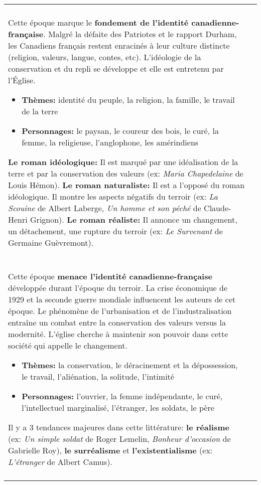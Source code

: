 \documentclass[11pt]{article}
\newcommand{\titre}[1]{{\Large\textbf{#1}}}
\begin{document}
\begin{tabularx}{\textwidth}{@{}XX@{}}
  \begin{minipage}[t]{\linewidth\fboxsep\fboxrule}
    \titre{Terroir (1840-1945)}\\
    Cette époque marque le \textbf{fondement de l'identité canadienne-française}. Malgré la défaite des Patriotes et le rapport Durham, les Canadiens français restent enracinés à leur culture distincte (religion, valeurs, langue, contes, etc). L'idéologie de la conservation et du repli se développe et elle est entretenu par l'Église.
    \begin{itemize}
      \item\textbf{Thèmes:} identité du peuple, la religion, la famille, le travail de la terre
      \item\textbf{Personnages:} le paysan, le coureur des bois, le curé, la femme, la religieuse, l'anglophone, les amérindiens
    \end{itemize}
    \textbf{Le roman idéologique:} Il est marqué par une idéalisation de la terre et par la conservation des valeurs (ex: \textit{Maria Chapedelaine} de Louis Hémon). \textbf{Le roman naturaliste:} Il est a l'opposé du roman idéologique. Il montre les aspects négatifs du terroir (ex: \textit{La Scouine} de Albert Laberge, \textit{Un homme et son péché} de Claude-Henri Grignon). \textbf{Le roman réaliste:} Il annonce un changement, un détachement, une rupture du terroir (ex: \textit{Le Survenant} de Germaine Guèvremont).\\
  \end{minipage}&
  
  \begin{minipage}[t]{\linewidth\fboxsep\fboxrule}
    \titre{Littérature Urbaine (1945-1960)}\\
    Cette époque \textbf{menace l'identité canadienne-française} développée durant l'époque du terroir. La crise économique de 1929 et la seconde guerre mondiale influencent les auteurs de cet époque. Le phénomène de l'urbanisation et de l'industralisation entraîne un combat entre la conservation des valeurs versus la modernité. L'église cherche à maintenir son pouvoir dans cette société qui appelle le changement.
    \begin{itemize}
      \item\textbf{Thèmes:} la conservation, le déracinement et la dépossession, le travail, l'aliénation, la solitude, l'intimité
      \item\textbf{Personnages:} l'ouvrier, la femme indépendante, le curé, l'intellectuel marginalisé, l'étranger, les soldats, le père 
    \end{itemize}
    Il y a 3 tendances majeures dans cette littérature: \textbf{le réalisme} (ex: \textit{Un simple soldat} de Roger Lemelin, \textit{Bonheur d'occasion} de Gabrielle Roy), \textbf{le surréalisme} et \textbf{l'existentialisme} (ex: \textit{L'étranger} de Albert Camus).\\
  \end{minipage}\\
  

\end{tabularx}
\end{document}
